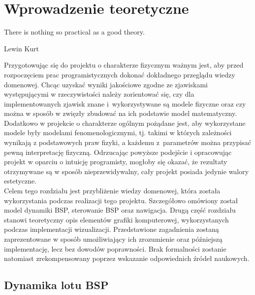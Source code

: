 \section{Wprowadzenie teoretyczne}

\epigraph{There is nothing so practical as a good theory.}{Lewin Kurt}

Przygotowując się do projektu o charakterze fizycznym ważnym jest, aby przed rozpoczęciem prac programistycznych dokonać dokładnego przeglądu wiedzy domenowej. Chcąc uzyskać wyniki jakościowe zgodne ze zjawiskami występującymi w rzeczywistości należy zorientować się, czy dla implementowanych zjawisk znane i~wykorzystywane są modele fizyczne oraz czy można w sposób w zwięzły zbudować na ich podstawie model matematyczny. Dodatkowo w projekcie o charakterze ogólnym pożądane jest, aby wykorzystane modele były modelami fenomenologicznymi, tj. takimi w których zależności wynikają z podstawowych praw fizyki, a każdemu z~parametrów można przypisać pewną interpretację fizyczną. Odrzucając powyższe podejście i opracowując projekt w oparciu o intuicję programisty, mogłoby się okazać, że rezultaty otrzymywane są w sposób nieprzewidywalny, cały projekt posiada jedynie walory estetyczne.\\

Celem tego rozdziału jest przybliżenie wiedzy domenowej, która została wykorzystania podczas realizacji tego projektu. Szczegółowo omówiony został model dynamiki BSP, sterowanie BSP oraz nawigacja. Drugą część rozdziału stanowi teoretyczny opis elementów grafiki komputerowej, wykorzystanych podczas implementacji wizualizacji. Przedstawione zagadnienia zostaną zaprezentowane w sposób umożliwiający ich zrozumienie oraz późniejszą implementację, lecz  bez dowodów poprawności. Brak formalności zostanie natomiast zrekompensowany poprzez wskazanie odpowiednich źródeł naukowych.

\subsection{Dynamika lotu BSP}

